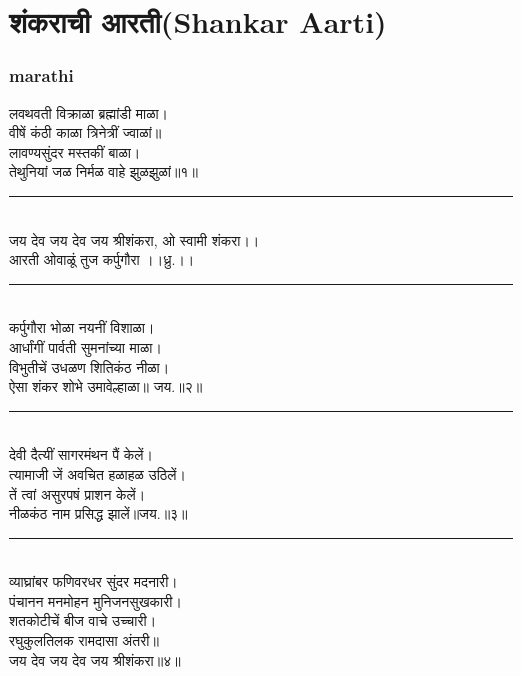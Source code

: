 \documentclass[letterpaper,twocolumn,openany,nodeprecatedcode]{dndbook}
\begin{document}
\chapter{शंकराची आरती(Shankar Aarti)}
\begin{flushleft}
  \subsection*{marathi}
  लवथवती विक्राळा ब्रह्मांडी माळा। \\
  वीषें कंठी काळा त्रिनेत्रीं ज्वाळां॥ \\
  लावण्यसुंदर मस्तकीं बाळा। \\
  तेथुनियां जळ निर्मळ वाहे झुळझुळां॥१॥ \\
  \rule{\linewidth}{1pt} \\
  जय देव जय देव जय श्रीशंकरा, ओ स्वामी शंकरा।। \\
  आरती ओवाळूं तुज कर्पुगौरा ।।ध्रु.।। \\
  \rule{\linewidth}{1pt} \\
  कर्पुगौरा भोळा नयनीं विशाळा। \\
  आर्धांगीं पार्वती सुमनांच्या माळा। \\
  विभुतीचें उधळण शितिकंठ नीळा। \\
  ऐसा शंकर शोभे उमावेल्हाळा॥ जय.॥२॥ \\
  \rule{\linewidth}{1pt} \\
  देवी दैत्यीं सागरमंथन पैं केलें। \\
  त्यामाजी जें अवचित हळाहळ उठिलें। \\
  तें त्वां असुरपषं प्राशन केलें। \\
  नीळकंठ नाम प्रसिद्ध झालें॥जय.॥३॥ \\
  \rule{\linewidth}{1pt} \\
  व्याघ्रांबर फणिवरधर सुंदर मदनारी।\\
  पंचानन मनमोहन मुनिजनसुखकारी।\\
  शतकोटीचें बीज वाचे उच्चारी।\\
  रघुकुलतिलक रामदासा अंतरी॥\\
  जय देव जय देव जय श्रीशंकरा॥४॥
  \pagebreak

\end{flushleft}
\end{document}
